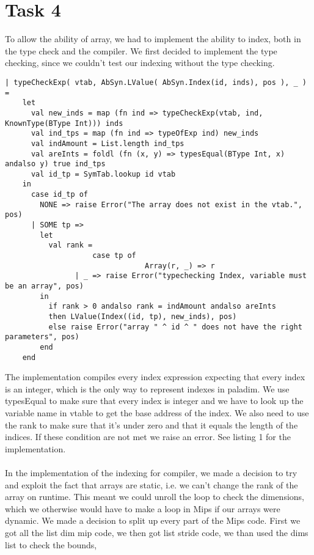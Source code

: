 \section{Task 4}

To allow the ability of array, we had to implement the ability to index, both in the type check and the compiler. We first decided to implement
the type checking, since we couldn't test our indexing without the type checking.

\begin{lstlisting}[style=MLStyle, caption=type checking for indexing]		
| typeCheckExp( vtab, AbSyn.LValue( AbSyn.Index(id, inds), pos ), _ ) =
    let 
      val new_inds = map (fn ind => typeCheckExp(vtab, ind, KnownType(BType Int))) inds
      val ind_tps = map (fn ind => typeOfExp ind) new_inds
      val indAmount = List.length ind_tps
      val areInts = foldl (fn (x, y) => typesEqual(BType Int, x) andalso y) true ind_tps
      val id_tp = SymTab.lookup id vtab
    in
      case id_tp of 
        NONE => raise Error("The array does not exist in the vtab.", pos)
      | SOME tp => 
        let
          val rank = 
					case tp of
								Array(r, _) => r
                | _ => raise Error("typechecking Index, variable must be an array", pos)
        in
          if rank > 0 andalso rank = indAmount andalso areInts 
          then LValue(Index((id, tp), new_inds), pos)
          else raise Error("array " ^ id ^ " does not have the right parameters", pos)
        end
    end	
\end{lstlisting}
The implementation compiles every index expression expecting that every index is an integer, which is the only way to represent indexes in 
paladim. We use typesEqual to make sure that every index is integer and we have to look up the variable name in vtable to get the base address of the index. 
We also need to use the rank to make sure that it's under zero and that it equals the length of the indices. If these condition are not met we raise an error. 
See listing 1 for the implementation.
\\
\\
In the implementation of the indexing for compiler, we made a decision to try
and exploit the fact that arrays are static, i.e. we can't change
the rank of the array on runtime. This meant we could unroll the loop to check the dimensions, which we otherwise would have to make a loop in
Mips if our arrays were dynamic. We made a decision to split up every part of the Mips code.
First we got all the list dim mip code, we then got list stride code, we than used the dims list to check the bounds, 
